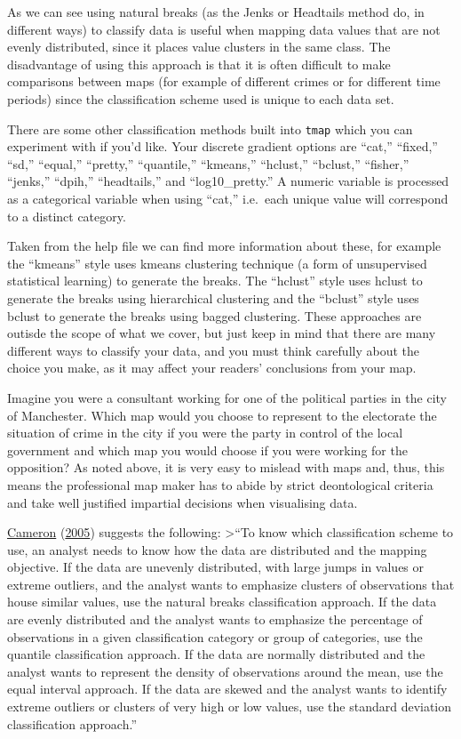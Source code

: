 \documentclass[
]{book}
\begin{document}
As we can see using natural breaks (as the Jenks or Headtails method do, in different ways) to classify data is useful when mapping data values that are not evenly distributed, since it places value clusters in the same class. The disadvantage of using this approach is that it is often difficult to make comparisons between maps (for example of different crimes or for different time periods) since the classification scheme used is unique to each data set.

There are some other classification methods built into \texttt{tmap} which you can experiment with if you'd like. Your discrete gradient options are ``cat,'' ``fixed,'' ``sd,'' ``equal,'' ``pretty,'' ``quantile,'' ``kmeans,'' ``hclust,'' ``bclust,'' ``fisher,'' ``jenks,'' ``dpih,'' ``headtails,'' and ``log10\_pretty.'' A numeric variable is processed as a categorical variable when using ``cat,'' i.e.~each unique value will correspond to a distinct category.

Taken from the help file we can find more information about these, for example the ``kmeans'' style uses kmeans clustering technique (a form of unsupervised statistical learning) to generate the breaks. The ``hclust'' style uses hclust to generate the breaks using hierarchical clustering and the ``bclust'' style uses bclust to generate the breaks using bagged clustering. These approaches are outisde the scope of what we cover, but just keep in mind that there are many different ways to classify your data, and you must think carefully about the choice you make, as it may affect your readers' conclusions from your map.

Imagine you were a consultant working for one of the political parties in the city of Manchester. Which map would you choose to represent to the electorate the situation of crime in the city if you were the party in control of the local government and which map you would choose if you were working for the opposition? As noted above, it is very easy to mislead with maps and, thus, this means the professional map maker has to abide by strict deontological criteria and take well justified impartial decisions when visualising data.

\protect\hyperlink{ref-Cameron_2005}{Cameron} (\protect\hyperlink{ref-Cameron_2005}{2005}) suggests the following:
\textgreater{}``To know which classification scheme to use, an analyst needs to know how the
data are distributed and the mapping objective. If the data are unevenly distributed, with large jumps in values or extreme outliers, and the analyst wants to emphasize clusters of observations that house similar values, use the natural breaks classification approach. If the data are evenly distributed and the analyst wants to emphasize the percentage of observations in a given classification category or group of categories, use the quantile classification approach. If the data are normally distributed and the analyst wants to represent the density of observations around the mean, use the equal interval approach. If the data are skewed and the analyst wants to identify extreme outliers or clusters of very high or low values, use the standard deviation classification
approach.''
\end{document}
